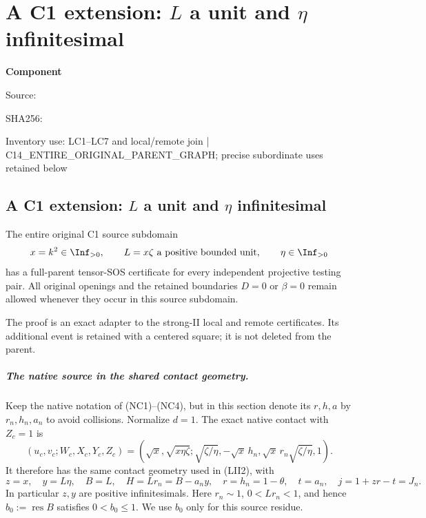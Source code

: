 \chapter{A C1 extension: $L$ a unit and $\eta$ infinitesimal}
\label{component:p080aa62de16d}
\noindent\textbf{Component }\par
{\small\noindent Source: \par}
{\small\noindent SHA256: \par}
{\small\noindent Inventory use: LC1--LC7 and local/remote join | C14\_\allowbreak{}ENTIRE\_\allowbreak{}ORIGINAL\_\allowbreak{}PARENT\_\allowbreak{}GRAPH; precise subordinate uses retained below\par}
\medskip
\section{A C1 extension: $L$ a unit and $\eta$ infinitesimal}
\label{p080aa62de16d:sec:r7-c1-L-unit-eta-small}

\begin{theorem}
The entire original C1 source subdomain
\[
 x=k^2\in\Inf_{>0},\qquad L=x\zeta\text{ a positive bounded unit},
 \qquad \eta\in\Inf_{>0}
\]
has a full-parent tensor-SOS certificate for every independent
projective testing pair.  All original openings and the retained
boundaries $D=0$ or $\beta=0$ remain allowed whenever they occur
in this source subdomain.
\end{theorem}

The proof is an exact adapter to the strong-II local and remote
certificates.  Its additional event is retained with a centered
square; it is not deleted from the parent.

\paragraph{The native source in the shared contact geometry.}
Keep the native notation of (NC1)--(NC4), but in this section denote
its $r,h,a$ by $r_n,h_n,a_n$ to avoid collisions.  Normalize $d=1$.
The exact native contact with $Z_c=1$ is
\[
 (u_c,v_c;W_c,X_c,Y_c,Z_c)
 =\left(\sqrt x,\sqrt{x\eta\zeta};
 \sqrt{\zeta/\eta},-\sqrt x\,h_n,
 \sqrt x\,r_n\sqrt{\zeta/\eta},1\right).
\]
It therefore has the same contact geometry used in (LII2), with
\[
 z=x,\quad y=L\eta,\quad B=L,\quad H=Lr_n=B-a_ny,
 \quad r=h_n=1-\theta,\quad t=a_n,\quad
 j=1+zr-t=J_n.                                           \tag{LC1}
\]
In particular $z,y$ are positive infinitesimals.  Here $r_n\sim1$,
$0<Lr_n<1$, and hence $b_0:=\operatorname{res}B$ satisfies
$0<b_0\le1$.  We use $b_0$ only for this source residue.

